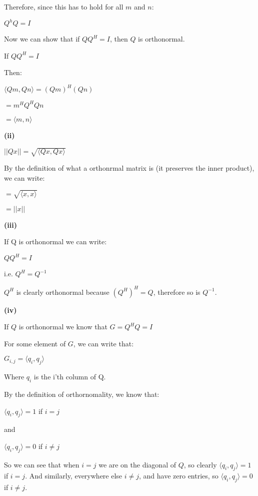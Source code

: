 \documentclass[letterpaper,12pt]{article}
\theoremstyle{definition}
\begin{document}
\begin{spacing}{1.3}{}
	Therefore, since this has to hold for all $m$ and $n$:
	
	$Q^hQ = I$
	
	Now we can show that if $QQ^H = I$, then $Q$ is orthonormal.
	
	If $QQ^H = I$
	
	Then:
	
	$\langle Qm, Qn \rangle = (Qm)^H(Qn)$
	
	$=m^HQ^HQn$
	
	$=\langle m, n \rangle$
	
	\setlength{\leftskip}{10pt}
	
	\textbf{(ii)}
	
	\setlength{\leftskip}{20pt}
	
	$||Qx|| = \sqrt{\langle Qx, Qx \rangle}$
	
	By the definition of what a orthonrmal matrix is (it preserves the inner product), we can write:
	
	$= \sqrt{\langle x, x \rangle}$
	
	
	$= ||x||$
	
	\setlength{\leftskip}{10pt}
	
	\textbf{(iii)}
	
	\setlength{\leftskip}{20pt}
	
	If Q is orthonormal we can write:
	
	$QQ^H = I$
	
	i.e. $Q^H = Q^{-1}$
	
	$Q^H$ is clearly orthonormal because $(Q^H)^H = Q$, therefore so is $Q^{-1}$.
	
	\setlength{\leftskip}{10pt}
	
	\textbf{(iv)}
	
	\setlength{\leftskip}{20pt}
	
	If $Q$ is orthonormal we know that $G =Q^HQ = I$
	
	For some element of $G$, we can write that:
	
	$G_{i, j} = \langle q_{i}, q_{j} \rangle$
	
	Where $q_{i}$ is the i'th column of Q.
	
	By the definition of orthornomality, we know that:
	
	$\langle q_{i}, q_{j} \rangle = 1$ if $i=j$
	
	and
	
	$\langle q_{i}, q_{j} \rangle = 0$ if $i \neq j$
	
	So we can see that when $i=j$ we are on the diagonal of $Q$, so clearly $\langle q_{i}, q_{j} \rangle = 1$ if $i=j$. And similarly, everywhere else $i \neq j$, and have zero entries, so $\langle q_{i}, q_{j} \rangle = 0$ if $i \neq j$.
	

\end{spacing}
\end{document}
